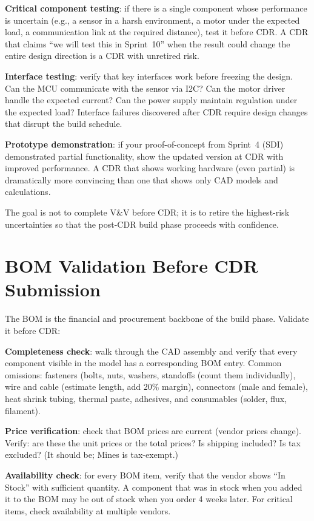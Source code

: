 \textbf{Critical component testing}: if there is a single component whose performance is uncertain (e.g., a sensor in a harsh environment, a motor under the expected load, a communication link at the required distance), test it before CDR. A CDR that claims ``we will test this in Sprint~10'' when the result could change the entire design direction is a CDR with unretired risk.

\textbf{Interface testing}: verify that key interfaces work before freezing the design. Can the MCU communicate with the sensor via I2C? Can the motor driver handle the expected current? Can the power supply maintain regulation under the expected load? Interface failures discovered after CDR require design changes that disrupt the build schedule.

\textbf{Prototype demonstration}: if your proof-of-concept from Sprint~4 (SDI) demonstrated partial functionality, show the updated version at CDR with improved performance. A CDR that shows working hardware (even partial) is dramatically more convincing than one that shows only CAD models and calculations.

The goal is not to complete V\&V before CDR; it is to retire the highest-risk uncertainties so that the post-CDR build phase proceeds with confidence.



\section{BOM Validation Before CDR Submission}
The BOM is the financial and procurement backbone of the build phase. Validate it before CDR:

\textbf{Completeness check}: walk through the CAD assembly and verify that every component visible in the model has a corresponding BOM entry. Common omissions: fasteners (bolts, nuts, washers, standoffs (count them individually), wire and cable (estimate length, add 20\% margin), connectors (male and female), heat shrink tubing, thermal paste, adhesives, and consumables (solder, flux, filament).

\textbf{Price verification}: check that BOM prices are current (vendor prices change). Verify: are these the unit prices or the total prices? Is shipping included? Is tax excluded? (It should be; Mines is tax-exempt.)

\textbf{Availability check}: for every BOM item, verify that the vendor shows ``In Stock'' with sufficient quantity. A component that was in stock when you added it to the BOM may be out of stock when you order 4 weeks later. For critical items, check availability at multiple vendors.

